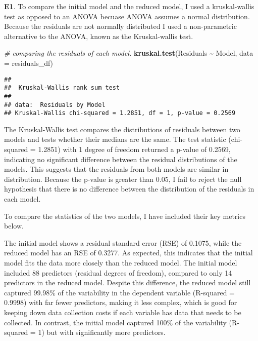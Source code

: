 \documentclass[
]{article}
\newenvironment{Shaded}{\begin{snugshade}}{\end{snugshade}}
\newcommand{\AttributeTok}[1]{\textcolor[rgb]{0.13,0.29,0.53}{#1}}
\newcommand{\CommentTok}[1]{\textcolor[rgb]{0.56,0.35,0.01}{\textit{#1}}}
\newcommand{\FunctionTok}[1]{\textcolor[rgb]{0.13,0.29,0.53}{\textbf{#1}}}
\newcommand{\NormalTok}[1]{#1}
\newcommand{\SpecialCharTok}[1]{\textcolor[rgb]{0.81,0.36,0.00}{\textbf{#1}}}
\begin{document}
\textbf{E1}. To compare the initial model and the reduced model, I used
a kruskal-wallis test as opposed to an ANOVA becuase ANOVA assumes a
normal distribution. Because the residuals are not normally distributed
I used a non-parametric alternative to the ANOVA, known as the
Kruskal-wallis test.\\

\begin{Shaded}
\begin{Highlighting}[]
\CommentTok{\# comparing the residuals of each model.}
\FunctionTok{kruskal.test}\NormalTok{(Residuals }\SpecialCharTok{\textasciitilde{}}\NormalTok{ Model, }\AttributeTok{data =}\NormalTok{ residuals\_df)}
\end{Highlighting}
\end{Shaded}

\begin{verbatim}
## 
##  Kruskal-Wallis rank sum test
## 
## data:  Residuals by Model
## Kruskal-Wallis chi-squared = 1.2851, df = 1, p-value = 0.2569
\end{verbatim}

The Kruskal-Wallis test compares the distributions of residuals between
two models and tests whether their medians are the same. The test
statistic (chi-squared = 1.2851) with 1 degree of freedom returned a
p-value of 0.2569, indicating no significant difference between the
residual distributions of the models. This suggests that the residuals
from both models are similar in distribution. Because the p-value is
greater than 0.05, I fail to reject the null hypothesis that there is no
difference between the distribution of the residuals in each model.

To compare the statistics of the two models, I have included their key
metrics below.

The initial model shows a residual standard error (RSE) of 0.1075, while
the reduced model has an RSE of 0.3277. As expected, this indicates that
the initial model fits the data more closely than the reduced model. The
initial model included 88 predictors (residual degrees of freedom),
compared to only 14 predictors in the reduced model. Despite this
difference, the reduced model still captured 99.98\% of the variability
in the dependent variable (R-squared = 0.9998) with far fewer
predictors, making it less complex, which is good for keeping down data
collection costs if each variable has data that needs to be collected.
In contrast, the initial model captured 100\% of the variability
(R-squared = 1) but with significantly more predictors.
\end{document}
